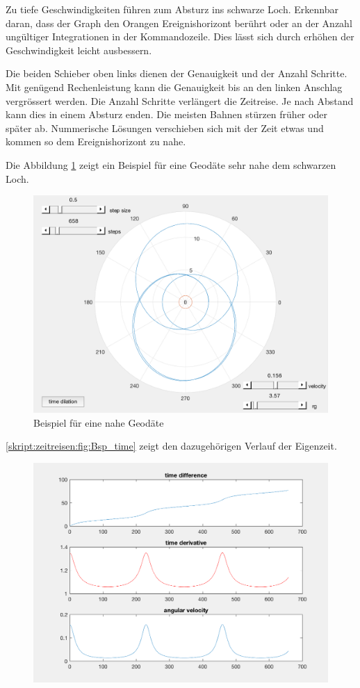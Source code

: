 \begin{refsection}
    Zu tiefe Geschwindigkeiten führen zum Absturz ins schwarze Loch. Erkennbar daran, dass der Graph den Orangen Ereignishorizont berührt oder an der Anzahl ungültiger Integrationen in der Kommandozeile. Dies lässt sich durch erhöhen der Geschwindigkeit leicht ausbessern.
    
    Die beiden Schieber oben links dienen der Genauigkeit und der Anzahl Schritte. Mit genügend Rechenleistung kann die Genauigkeit bis an den linken Anschlag vergrössert werden. Die Anzahl Schritte verlängert die Zeitreise. Je nach Abstand kann dies in einem Absturz enden. Die meisten Bahnen stürzen früher oder später ab. Nummerische Lösungen verschieben sich mit der Zeit etwas und kommen so dem Ereignishorizont zu nahe.
    
    Die Abbildung \ref{skript:zeitreisen:fig:Bsp} zeigt ein Beispiel für eine Geodäte sehr nahe dem schwarzen Loch.
      \begin{figure}
        \centering
        \includegraphics[width=12cm]{zeitreisen/Bsp.png}
        \caption{Beispiel für eine nahe Geodäte}
        \label{skript:zeitreisen:fig:Bsp} 
    \end{figure}
    \ref{skript:zeitreisen:fig:Bsp_time} zeigt den dazugehörigen Verlauf der Eigenzeit.
      \begin{figure}
        \centering
        \includegraphics[width=12cm]{zeitreisen/Bsp_time.png}

\end{figure}
\end{refsection}
